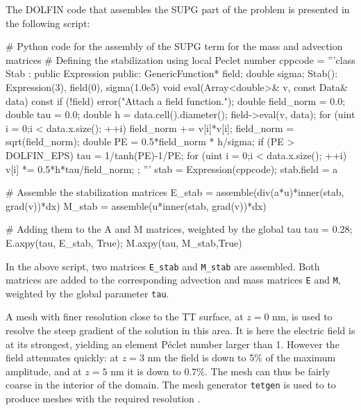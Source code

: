 The DOLFIN code that assembles the SUPG part of the problem is
presented in the following script:
\begin{python}
# Python code for the assembly of the SUPG term for the mass and advection matrices
# Defining the stabilization using local Peclet number
cppcode = '''class Stab : public Expression {
public:
  GenericFunction* field; double sigma;
  Stab(): Expression(3), field(0), sigma(1.0e5){}
  void eval(Array<double>& v, const Data& data) const {
    if (!field)
      error("Attach a field function.");
    double field_norm = 0.0; double tau = 0.0;
    double h = data.cell().diameter();
    field->eval(v, data);
    for (uint i = 0;i < data.x.size(); ++i)
      field_norm += v[i]*v[i];
    field_norm = sqrt(field_norm);
    double PE = 0.5*field_norm * h/sigma;
    if (PE > DOLFIN_EPS)
      tau = 1/tanh(PE)-1/PE;
    for (uint i = 0;i < data.x.size(); ++i)
      v[i] *= 0.5*h*tau/field_norm;
}};
'''
stab = Expression(cppcode); stab.field = a

# Assemble the stabilization matrices
E_stab = assemble(div(a*u)*inner(stab, grad(v))*dx)
M_stab = assemble(u*inner(stab, grad(v))*dx)

# Adding them to the A and M matrices, weighted by the global tau
tau = 0.28; E.axpy(tau, E_stab, True); M.axpy(tau, M_stab,True)
\end{python}
In the above script, two matrices \texttt{E\_stab} and
\texttt{M\_stab} are assembled. Both matrices are added to the
corresponding advection and mass matrices \texttt{E} and \texttt{M},
weighted by the global parameter \texttt{tau}.

A mesh with finer resolution close to the TT surface, at $z=0$ nm, is
used to resolve the steep gradient of the solution in this area. It is
here the electric field is at its strongest, yielding an element
P\'eclet number larger than 1. However the field attenuates quickly: at
$z=3$ nm the field is down to 5\% of the maximum amplitude, and at
$z=5$ nm it is down to 0.7\%. The mesh can thus be fairly coarse in
the interior of the domain. The mesh generator \texttt{tetgen} is used
to to produce meshes with the required resolution \citep{Si2007}.

